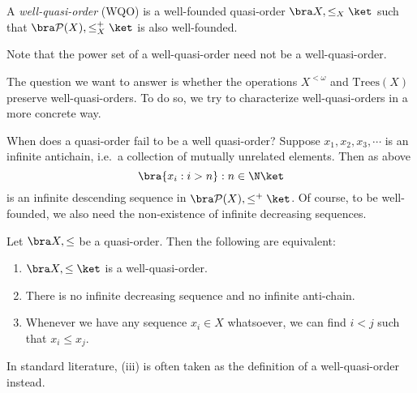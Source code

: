 \documentclass[a4paper]{article}
\begin{document}
\begin{defi}
  A \emph{well-quasi-order} (WQO) is a well-founded quasi-order $\bra X, \leq_X\ket$ such that $\bra \mathcal{P}(X), \leq_X^+\ket$ is also well-founded.
\end{defi}
Note that the power set of a well-quasi-order need not be a well-quasi-order.

The question we want to answer is whether the operations $X^{<\omega}$ and $\mathrm{Trees}(X)$ preserve well-quasi-orders. To do so, we try to characterize well-quasi-orders in a more concrete way.

When does a quasi-order fail to be a well quasi-order? Suppose $x_1, x_2, x_3, \cdots$ is an infinite antichain, i.e.\ a collection of mutually unrelated elements. Then as above
\[
  \bra \{x_i: i > n\}: n \in \N\ket
\]
is an infinite descending sequence in $\bra \mathcal{P}(X), \leq^+\ket$. Of course, to be well-founded, we also need the non-existence of infinite decreasing sequences.

\begin{prop}
  Let $\bra X, \leq$ be a quasi-order. Then the following are equivalent:
  \begin{enumerate}
    \item $\bra X, \leq\ket$ is a well-quasi-order.
    \item There is no infinite decreasing sequence and no infinite anti-chain.
    \item Whenever we have any sequence $x_i \in X$ whatsoever, we can find $i < j$ such that $x_i \leq x_j$.
  \end{enumerate}
\end{prop}
In standard literature, (iii) is often taken as the definition of a well-quasi-order instead.
\end{document}

